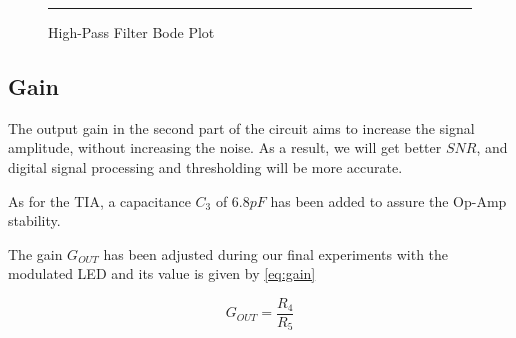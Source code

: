 \begin{figure}[htbp]
    \centering
    \rule{35em}{0.5pt}
    \caption{High-Pass Filter Bode Plot}
    \label{fig:hpf-bode}
\end{figure}
\subsection{Gain}


The output gain in the second part of the circuit aims to increase the signal amplitude, without increasing the noise. As a result, we will get better $SNR$, and digital signal processing and thresholding will be more accurate.

As for the TIA, a capacitance $C_3$ of $6.8pF$ has been added to assure the Op-Amp stability.

The gain $G_{OUT}$ has been adjusted during our final experiments with the modulated LED and its value is given by \ref{eq:gain}

\begin{equation}
G_{OUT}  = \frac{R_{4}}{R_{5}}
\label{eq:gain}
\end{equation}


